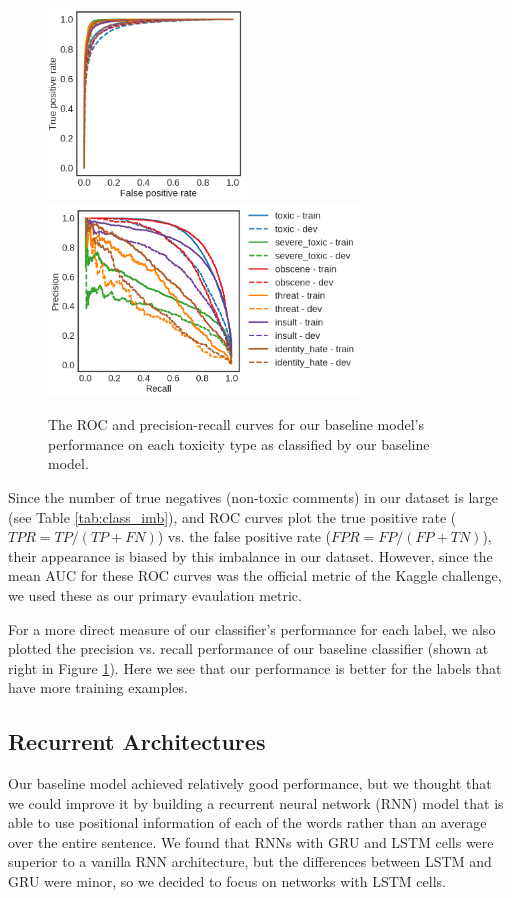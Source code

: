 \documentclass{article} %
\begin{document}
\begin{figure}[h]
	\centering
    \includegraphics[height=2in]{baseline_roc.png}
    \includegraphics[height=2in]{ff_l3_h302010_f300_prc.png}
    \caption{The ROC and precision-recall curves for our baseline model's performance on each toxicity type as classified by our baseline model.}
    \label{fig:roc}
\end{figure}
   
Since the number of true negatives (non-toxic comments) in our dataset is large (see Table \ref{tab:class_imb}), and ROC curves plot the true positive rate ($TPR = TP/(TP+FN)$) vs. the false positive rate ($FPR = FP/(FP+TN)$), their appearance is biased by this imbalance in our dataset. However, since the mean AUC for these ROC curves was  the official metric of the Kaggle challenge, we used these as our primary evaulation metric. 

For a more direct measure of our classifier's performance for each label, we also plotted the precision vs. recall performance of our baseline classifier (shown at right in Figure \ref{fig:roc}). Here we see that our performance is better for the labels that have more training examples.

\subsection{Recurrent Architectures}
\label{sec:lstm}

Our baseline model achieved relatively good performance, but we thought that we could improve it by building a recurrent neural network (RNN) model that is able to use positional information of each of the words rather than an average over the entire sentence. We found that RNNs with GRU and LSTM cells were superior to a vanilla RNN architecture, but the differences between LSTM and GRU were minor, so we decided to focus on networks with LSTM cells.
\end{document}
